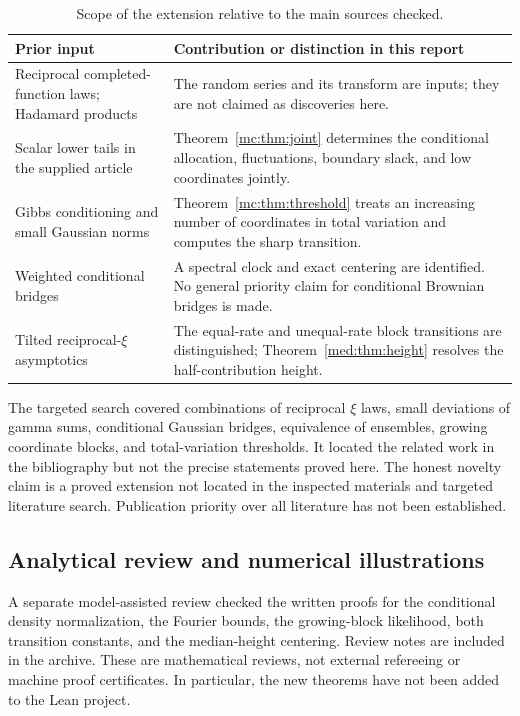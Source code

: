 \begin{table}[htbp]
\centering\small
\begin{tabular}{@{}>{\raggedright\arraybackslash}p{}>{\raggedright\arraybackslash}p{}@{}}
\toprule
Prior input & Contribution or distinction in this report\\
\midrule
Reciprocal completed-function laws; Hadamard products
\cite{RoynetteYor,GaoHannigLeeTorcaso}
& The random series and its transform are inputs; they are not claimed
as discoveries here.\\[5pt]
Scalar lower tails in the supplied article~\cite{ProveItArticle}
& Theorem~\ref{mc:thm:joint} determines the conditional allocation,
fluctuations, boundary slack, and low coordinates jointly.\\[5pt]
Gibbs conditioning and small Gaussian norms
\cite{CampenhoutCover,MayerWolfZeitouni}
& Theorem~\ref{mc:thm:threshold} treats an increasing number of
coordinates in total variation and computes the sharp transition.\\[5pt]
Weighted conditional bridges~\cite{SobolevShklyaev}
& A spectral clock and exact centering are identified. No general
priority claim for conditional Brownian bridges is made.\\[5pt]
Tilted reciprocal-$\xi$ asymptotics~\cite{Sra}
& The equal-rate and unequal-rate block transitions are distinguished;
Theorem~\ref{med:thm:height} resolves the half-contribution height.\\
\bottomrule
\end{tabular}
\caption{Scope of the extension relative to the main sources checked.}
\end{table}

The targeted search covered combinations of reciprocal $\xi$ laws,
small deviations of gamma sums, conditional Gaussian bridges,
equivalence of ensembles, growing coordinate blocks, and
total-variation thresholds. It located the related work in the
bibliography but not the precise statements proved here. The honest
novelty claim is a proved extension not located in the inspected
materials and targeted literature search. Publication priority over
all literature has not been established.

\subsection{Analytical review and numerical illustrations}

A separate model-assisted review checked the written proofs for the conditional
density normalization, the Fourier bounds, the growing-block
likelihood, both transition constants, and the median-height
centering. Review notes are included in the archive. These are
mathematical reviews, not external refereeing or machine proof certificates. In particular,
the new theorems have not been added to the Lean project.

